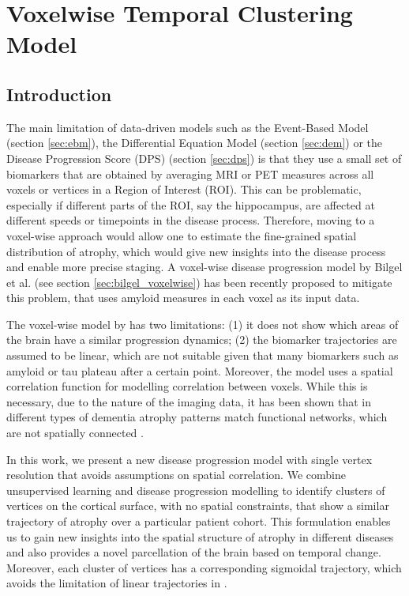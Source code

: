 \chapter{Voxelwise Temporal Clustering Model}
\label{chapter:voxelwise}

\section{Introduction}

The main limitation of data-driven models such as the Event-Based Model (section \ref{sec:ebm}), the Differential Equation Model (section \ref{sec:dem}) or the Disease Progression Score (DPS) (section \ref{sec:dps}) is that they use a small set of biomarkers that are obtained by averaging MRI or PET measures across all voxels or vertices in a Region of Interest (ROI). This can be problematic, especially if different parts of the ROI, say the hippocampus, are affected at different speeds or timepoints in the disease process. Therefore, moving to a voxel-wise approach would allow one to estimate the fine-grained spatial distribution of atrophy, which would give new insights into the disease process and enable more precise staging. A voxel-wise disease progression model by Bilgel et al. \cite{bilgel2016multivariate} (see section \ref{sec:bilgel_voxelwise}) has been recently proposed to mitigate this problem, that uses amyloid measures in each voxel as its input data.

The voxel-wise model by \cite{bilgel2016multivariate} has two limitations: (1) it does not show which areas of the brain have a similar progression dynamics; (2) the biomarker trajectories are assumed to be linear, which are not suitable given that many biomarkers such as amyloid or tau plateau after a certain point. Moreover, the model uses a spatial correlation function for modelling correlation between voxels. While this is necessary, due to the nature of the imaging data, it has been shown that in different types of dementia atrophy patterns match functional networks, which are not spatially connected \cite{seeley2009neurodegenerative}. 

In this work, we present a new disease progression model with single vertex resolution that avoids assumptions on spatial correlation. We combine unsupervised learning and disease progression modelling to identify clusters of vertices on the cortical surface, with no spatial constraints, that show a similar trajectory of atrophy over a particular patient cohort. This formulation enables us to gain new insights into the spatial structure of atrophy in different diseases and also provides a novel parcellation of the brain based on temporal change. Moreover, each cluster of vertices has a corresponding sigmoidal trajectory, which avoids the limitation of linear trajectories in \cite{bilgel2016multivariate}. 

